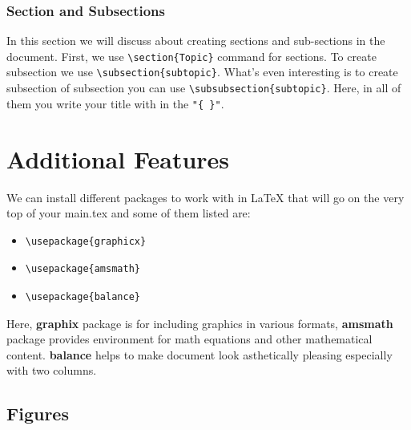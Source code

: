 \documentclass[12pt,journal,compsoc]{IEEEtran}
\begin{document}
\subsubsection{Section and Subsections}
In this section we will discuss about creating sections and sub-sections in the document. First, we use \verb|\section{Topic}| command for sections. To create subsection we use \verb|\subsection{subtopic}|.
What's even interesting is to create subsection of subsection you can use \verb|\subsubsection{subtopic}|. Here, in all of them you write your title with in the \verb|"{ }"|.
\section{Additional Features}
We can install different packages to work with in LaTeX that will go on the very top of your main.tex and some of them listed are:
\begin{itemize}
    \item
    \begin{verbatim}\usepackage{graphicx}
    \end{verbatim}
    \item 
    \begin{verbatim}\usepackage{amsmath} 
    \end{verbatim}
    \item 
    \begin{verbatim}\usepackage{balance} 
    \end{verbatim}
\end{itemize}
Here, \textbf{graphix} package is for including graphics in various formats, \textbf{amsmath} package provides environment for math equations and other mathematical content. \textbf{balance} helps to make document look asthetically pleasing especially with two columns. 

\subsection{Figures}
\end{document}
